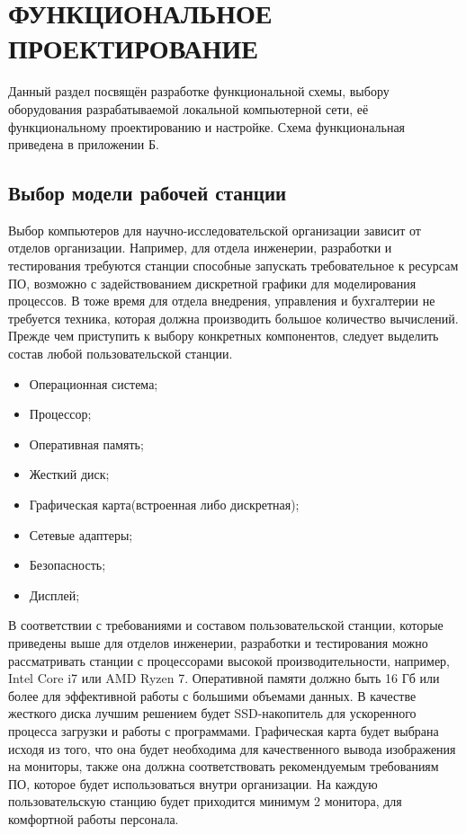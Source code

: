 \section{ФУНКЦИОНАЛЬНОЕ ПРОЕКТИРОВАНИЕ}
\label{sec:func}

Данный раздел посвящён разработке функциональной схемы, выбору оборудования 
разрабатываемой локальной компьютерной сети, её функциональному проектированию и настройке. 
Схема функциональная приведена в приложении Б. 

\subsection{Выбор модели рабочей станции}

Выбор компьютеров для научно-исследовательской организации зависит от отделов организации. 
Например, для отдела инженерии, разработки и тестирования требуются станции способные запускать требовательное к ресурсам ПО, 
возможно с задействованием дискретной графики для моделирования процессов. 
В тоже время для отдела внедрения, управления и бухгалтерии не требуется техника, которая должна производить большое количество вычислений.
Прежде чем приступить к выбору конкретных компонентов, следует выделить состав любой пользовательской станции.

\begin{itemize}
    \item Операционная система;
    \item Процессор;
    \item Оперативная память;
    \item Жесткий диск;
    \item Графическая карта(встроенная либо дискретная);
    \item Сетевые адаптеры;
    \item Безопасность;
    \item Дисплей;
\end{itemize}

В соответствии с требованиями и составом пользовательской станции, которые приведены выше для отделов инженерии, разработки и тестирования
можно рассматривать станции с процессорами высокой производительности, например, Intel Core i7 или AMD Ryzen 7. Оперативной памяти должно быть 16 Гб 
или более для эффективной работы с большими объемами данных. В качестве жесткого диска лучшим решением будет SSD-накопитель для ускоренного процесса 
загрузки и работы с программами. Графическая карта будет выбрана исходя из того, что она будет необходима для качественного вывода изображения на мониторы,
также она должна соответствовать рекомендуемым требованиям ПО, которое будет использоваться внутри организации. На каждую пользовательскую станцию будет приходится
минимум 2 монитора, для комфортной работы персонала.

